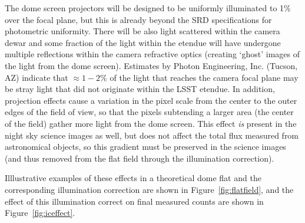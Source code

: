 \documentclass[12pt,preprint]{aastex}
\begin{document}
The dome screen projectors will be designed to be uniformly
illuminated to 1\% over the focal plane, but this is already beyond
the SRD specifications for photometric uniformity.  There will be also
light scattered within the camera dewar and some fraction of the light
within the etendue will have undergone multiple reflections within the
camera refractive optics (creating `ghost' images of the light from
the dome screen). Estimates by Photon Engineering, Inc. (Tucson, AZ)
indicate that $\approx1-2\%$ of the light that reaches the camera
focal plane may be stray light that did not originate within the LSST
etendue. In addition, projection effects cause a variation in the
pixel scale from the center to the outer edges of the field of view,
so that the pixels subtending a larger area (the center of the field)
gather more light from the dome screen. This effect {\it is} present
in the night sky science images as well, but does not affect the total
flux measured from astronomical objects, so this gradient must be
preserved in the science images (and thus removed from the flat field
through the illumination correction). 

Illlustrative examples of these effects in a theoretical dome flat and
the corresponding illumination correction are shown in
Figure~\ref{fig:flatfield}, and the effect of this illumination
correct on final measured counts are shown in
Figure~\ref{fig:iceffect}.
\end{document}
